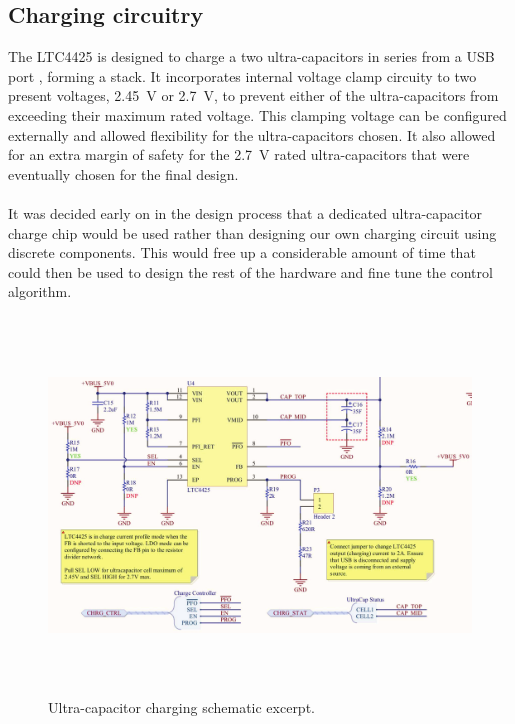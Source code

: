 \subsection{Charging circuitry}
The LTC4425 is designed to charge a two ultra-capacitors in series from a USB port , forming a stack. It incorporates internal voltage clamp circuity to two present voltages, \SI{2.45}{V} or \SI{2.7}{V}, to prevent either of the ultra-capacitors from exceeding their maximum rated voltage. This clamping voltage can be configured externally and allowed flexibility for the ultra-capacitors chosen. It also allowed for an extra margin of safety for the \SI{2.7}{V} rated ultra-capacitors that were eventually chosen for the final design.
\\ \\
It was decided early on in the design process that a dedicated ultra-capacitor charge chip would be used rather than designing our own charging circuit using discrete components. This would free up a considerable amount of time that could then be used to design the rest of the hardware and fine tune the control algorithm.
\begin{figure}
    \centering
    \includegraphics[height = 10cm]{figures/hardware/charging_schematic.pdf}
    \caption{Ultra-capacitor charging schematic excerpt.}
    \label{fig:charging}
\end{figure}
